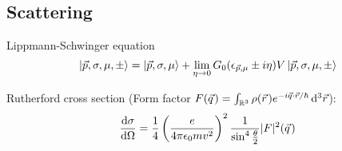 	\subsection{Scattering}
		\noindent
		Lippmann-Schwinger equation
		\begin{equation}
			\Ket{\vec{p},\sigma,\mu,\pm} = \Ket{\vec{p}, \sigma, \mu} + \lim_{\eta\rightarrow 0} G_0(\epsilon_{\vec{p},\mu}\pm i\eta) V \Ket{\vec{p},\sigma,\mu,\pm}
		\end{equation}

		\noindent
		Rutherford cross section (Form factor $F(\pvec{q}) = \int_{\mathbb{R}^3} \rho(\pvec{r}) e^{-i \vec{q}\cdot\vec{r}/\hbar}\, \diff^3 \vec{r} $):
		\begin{equation}
			\tder{\sigma}{\Omega} = \frac{1}{4} \Br{\frac{e}{4\pi\epsilon_0 m v^2}}^2
			\frac{1}{\sin^4\frac{\theta}{2}} \vbr{F}^2(\pvec{q})
		\end{equation}
